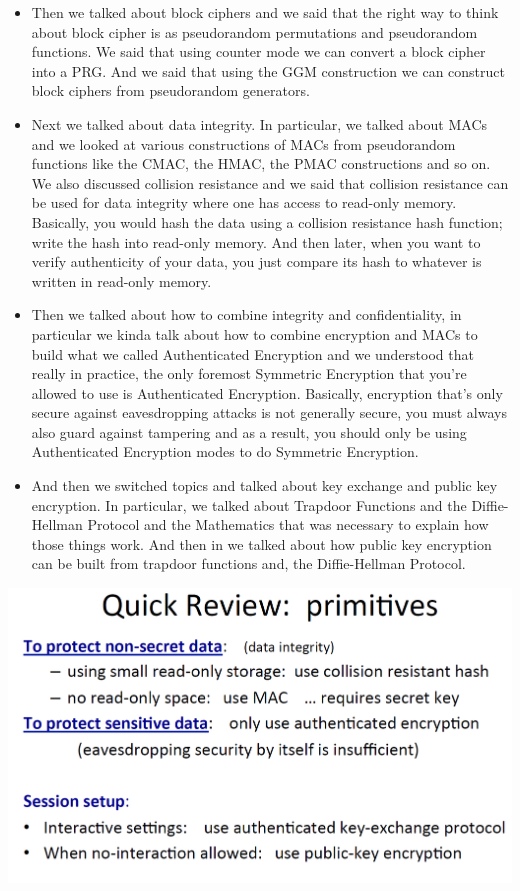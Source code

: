 \documentclass[11pt]{article}
\makeatletter
\def\maxwidth{\ifdim\Gin@nat@width>\linewidth\linewidth
    \else\Gin@nat@width\fi}
\let\Oldincludegraphics\includegraphics
\renewcommand{\includegraphics}[1]{\Oldincludegraphics[width=.8\maxwidth]{#1}}
\makeatother
\begin{document}
\begin{itemize}
\item
  Then we talked about block ciphers and we said that the right way to
  think about block cipher is as pseudorandom permutations and
  pseudorandom functions. We said that using counter mode we can convert
  a block cipher into a PRG. And we said that using the GGM construction
  we can construct block ciphers from pseudorandom generators. 
\item
  Next we talked about data integrity. In particular, we talked about
  MACs and we looked at various constructions of MACs from pseudorandom
  functions like the CMAC, the HMAC, the PMAC constructions and so on.
  We also discussed collision resistance and we said that collision
  resistance can be used for data integrity where one has access to
  read-only memory. Basically, you would hash the data using a collision
  resistance hash function; write the hash into read-only memory. And
  then later, when you want to verify authenticity of your data, you
  just compare its hash to whatever is written in read-only memory. 
\item
  Then we talked about how to combine integrity and confidentiality, in
  particular we kinda talk about how to combine encryption and MACs to
  build what we called Authenticated Encryption and we understood that
  really in practice, the only foremost Symmetric Encryption that you're
  allowed to use is Authenticated Encryption. Basically, encryption
  that's only secure against eavesdropping attacks is not generally
  secure, you must always also guard against tampering and as a result,
  you should only be using Authenticated Encryption modes to do
  Symmetric Encryption. 
\item
  And then we switched topics and talked about key exchange and public
  key encryption. In particular, we talked about Trapdoor Functions and
  the Diffie-Hellman Protocol and the Mathematics that was necessary to
  explain how those things work. And then in we talked about how public
  key encryption can be built from trapdoor functions and, the
  Diffie-Hellman Protocol.
\end{itemize}

\includegraphics{./Images/Review-Primitives2.png}
\end{document}
